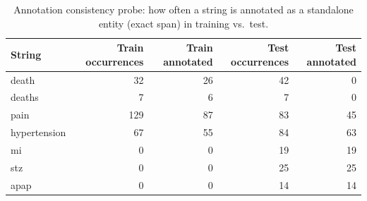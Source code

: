 \begin{table}[t]
\centering
\small
\caption{Annotation consistency probe: how often a string is annotated as a standalone entity (exact span) in training vs.\ test.}
\label{tab:annprobe}
\begin{tabular}{lrrrr}
\toprule
String & Train occurrences & Train annotated & Test occurrences & Test annotated \\
\midrule
death & 32 & 26 & 42 & 0 \\
deaths & 7 & 6 & 7 & 0 \\
pain & 129 & 87 & 83 & 45 \\
hypertension & 67 & 55 & 84 & 63 \\
mi & 0 & 0 & 19 & 19 \\
stz & 0 & 0 & 25 & 25 \\
apap & 0 & 0 & 14 & 14 \\
\bottomrule
\end{tabular}
\end{table}
